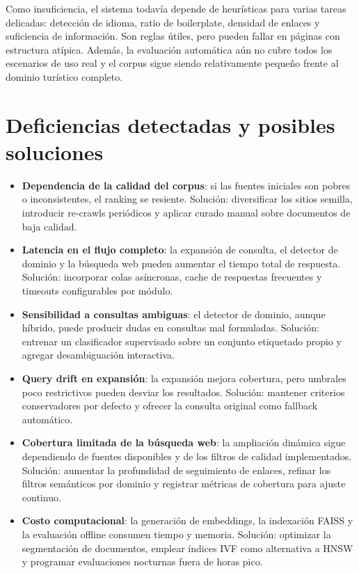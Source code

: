 \documentclass{llncs}
\begin{document}
Como insuficiencia, el sistema todavía depende de heurísticas para varias tareas delicadas: detección de idioma, ratio de boilerplate, densidad de enlaces y suficiencia de información. Son reglas útiles, pero pueden fallar en páginas con estructura atípica. Además, la evaluación automática aún no cubre todos los escenarios de uso real y el corpus sigue siendo relativamente pequeño frente al dominio turístico completo.

\section{Deficiencias detectadas y posibles soluciones}

\begin{itemize}
    \item \textbf{Dependencia de la calidad del corpus}: si las fuentes iniciales son pobres o inconsistentes, el ranking se resiente. Solución: diversificar los sitios semilla, introducir re-crawls periódicos y aplicar curado manual sobre documentos de baja calidad.
    \item \textbf{Latencia en el flujo completo}: la expansión de consulta, el detector de dominio y la búsqueda web pueden aumentar el tiempo total de respuesta. Solución: incorporar colas asíncronas, cache de respuestas frecuentes y timeouts configurables por módulo.
    \item \textbf{Sensibilidad a consultas ambiguas}: el detector de dominio, aunque híbrido, puede producir dudas en consultas mal formuladas. Solución: entrenar un clasificador supervisado sobre un conjunto etiquetado propio y agregar desambiguación interactiva.
    \item \textbf{Query drift en expansión}: la expansión mejora cobertura, pero umbrales poco restrictivos pueden desviar los resultados. Solución: mantener criterios conservadores por defecto y ofrecer la consulta original como fallback automático.
    \item \textbf{Cobertura limitada de la búsqueda web}: la ampliación dinámica sigue dependiendo de fuentes disponibles y de los filtros de calidad implementados. Solución: aumentar la profundidad de seguimiento de enlaces, refinar los filtros semánticos por dominio y registrar métricas de cobertura para ajuste continuo.
    \item \textbf{Costo computacional}: la generación de embeddings, la indexación FAISS y la evaluación offline consumen tiempo y memoria. Solución: optimizar la segmentación de documentos, emplear índices IVF como alternativa a HNSW y programar evaluaciones nocturnas fuera de horas pico.

\end{itemize}
\end{document}
